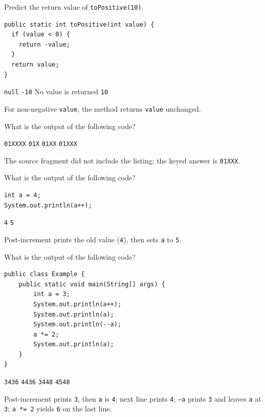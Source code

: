\newpage

\question[4]
Predict the return value of \texttt{toPositive(10)}.
\begin{lstlisting}[style=java]
public static int toPositive(int value) {
  if (value < 0) {
    return -value;
  }
  return value;
}
\end{lstlisting}
\begin{choices}
  \choice \texttt{null}
  \choice \texttt{-10}
  \choice No value is returned
  \CorrectChoice \texttt{10}
\end{choices}
\begin{solution}
  For non-negative \texttt{value}, the method returns \texttt{value} unchanged.
\end{solution}

\question[4]
What is the output of the following code?
\begin{choices}
  \choice \texttt{01XXXX}
  \choice \texttt{01X}
  \choice \texttt{01XX}
  \CorrectChoice \texttt{01XXX}
\end{choices}
\begin{solution}
  The source fragment did not include the listing; the keyed answer is \texttt{01XXX}.
\end{solution}

\question[4]
What is the output of the following code?
\begin{lstlisting}[style=java]
int a = 4;
System.out.println(a++);
\end{lstlisting}
\begin{choices}
  \CorrectChoice \texttt{4}
  \choice \texttt{5}
\end{choices}
\begin{solution}
  Post-increment prints the old value (\texttt{4}), then sets \texttt{a} to \texttt{5}.
\end{solution}

\question[4]
What is the output of the following code?
\begin{lstlisting}[style=java]
public class Example {
    public static void main(String[] args) {
        int a = 3;
        System.out.println(a++);
        System.out.println(a);
        System.out.println(--a);
        a *= 2;
        System.out.println(a);
    }
}
\end{lstlisting}
\begin{choices}
  \CorrectChoice \texttt{3436}
  \choice \texttt{4436}
  \choice \texttt{3448}
  \choice \texttt{4548}
\end{choices}
\begin{solution}
  Post-increment prints \texttt{3}, then \texttt{a} is \texttt{4}; next line prints \texttt{4}; \texttt{--a} prints \texttt{3} and leaves \texttt{a} at \texttt{3}; \texttt{a *= 2} yields \texttt{6} on the last line.
\end{solution}

